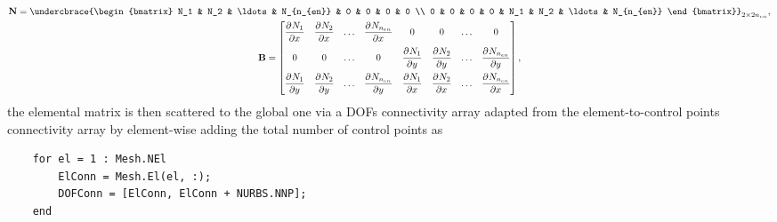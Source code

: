 \begin{equation}
\begin{gathered}
        \mathbf{N} = %
    \undercbrace{%
        \begin{bmatrix}
          N_1 & N_2 & \ldots & N_{n_{en}} & 0   & 0   & 0      & 0 \\
          0   & 0  & 0      & 0      & N_1 & N_2 & \ldots & N_{n_{en}}
        \end{bmatrix}}_{2 \times 2n_{en}},\\
    \mathbf{B} =
        \begin{bmatrix}
          \dpd{N_1}{x} & \dpd{N_2}{x} & \ldots & \dpd{N_{n_{en}}}{x} & 0 & 0 & \ldots & 0\\[10pt]
          0 & 0 & \ldots & 0 & \dpd{N_1}{y} & \dpd{N_2}{y} & \ldots & \dpd{N_{n_{en}}}{y} \\[10pt]
          \dpd{N_1}{y} & \dpd{N_2}{y} & \ldots & \dpd{N_{n_{en}}}{y} & \dpd{N_1}{x} & \dpd{N_2}{x} & \ldots & \dpd{N_{n_{en}}}{x}
        \end{bmatrix},
\end{gathered}
\end{equation}
the elemental matrix is then scattered to the global one via a DOFs connectivity array adapted from the element-to-control points connectivity array by element-wise adding the total number of control points as
\begin{lstlisting}
    for el = 1 : Mesh.NEl
        ElConn = Mesh.El(el, :);
        DOFConn = [ElConn, ElConn + NURBS.NNP];
    end
\end{lstlisting}

